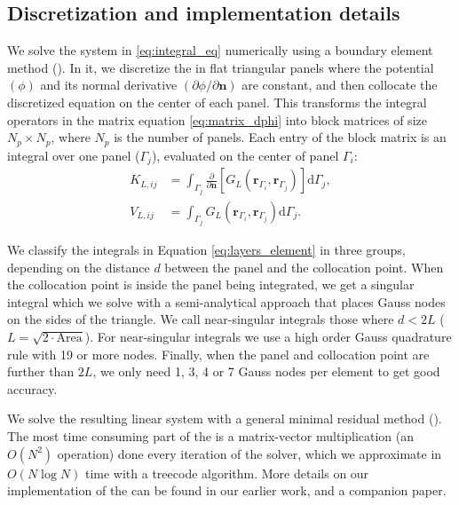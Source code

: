 

\subsection{Discretization and implementation details}

We solve the system in \eqref{eq:integral_eq} numerically using a boundary element method (\bem). In it, we discretize the \ses in flat triangular panels where the potential $(\phi)$ and its normal derivative $(\partial \phi /\partial \mathbf{n})$ are constant, and then collocate the discretized equation on the center of each panel. This transforms the integral operators in the matrix equation \eqref{eq:matrix_dphi} into block matrices of size $N_p \times N_p$, where $N_p$ is the number of panels. Each entry of the block matrix is an integral over one panel ($\Gamma_j$), evaluated on the center of panel $\Gamma_i$:
%
\begin{align} \label{eq:layers_element}
K_{L,ij} &= \int_{\Gamma_j} \frac{\partial}{\partial \mathbf{n}} \left[ G_L(\mathbf{r}_{\Gamma_i},\mathbf{r}_{\Gamma_j}) \right]\mathrm{d} \Gamma_j, \nonumber \\
V_{L,ij} &= \int_{\Gamma_j} G_L(\mathbf{r}_{\Gamma_i},\mathbf{r}_{\Gamma_j})  \mathrm{d} \Gamma_j.
\end{align}

We classify the integrals in Equation \eqref{eq:layers_element} in three groups, depending on the distance $d$ between the panel and the collocation point. 
When the collocation point is inside the panel being integrated, we get a singular integral which we solve with a semi-analytical approach\cite{ZhuHuangSongWhite2001} that places Gauss nodes on the sides of the triangle. 
We call near-singular integrals those where $d<2L$ ($L = \sqrt{2\cdot \text{Area}}$). For near-singular integrals we use a high order Gauss quadrature rule with 19 or more nodes. 
Finally, when the panel and collocation point are further than $2L$, we only need 1, 3, 4 or 7 Gauss nodes per element to get good accuracy.

We solve the resulting linear system with a general minimal residual method (\gmres). The most time consuming part of the \gmres is a matrix-vector multiplication (an $O(N^2)$ operation) done every iteration of the solver, which we approximate in $O(N\log N)$ time with a treecode algorithm.\cite{BarnesHut1986} More details on our implementation of the \bem can be found in our earlier work,\cite{CooperBarba-share154331} and a companion paper.\cite{CooperBarba2015a}
